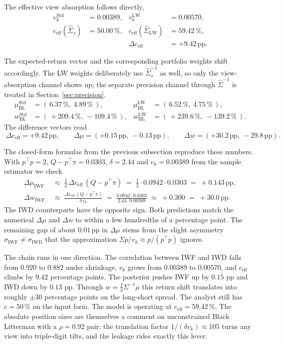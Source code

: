 \documentclass[a4paper,11pt]{article}
\theoremstyle{plain}
\theoremstyle{definition}
\newcommand{\Std}{\mathrm{Std}}
\newcommand{\LW}{\mathrm{LW}}
\newcommand{\eff}{\mathrm{eff}}
\begin{document}
The effective view absorption follows directly,
\begin{align*}
    v_k^\Std &= 0.00389, & v_k^\LW &= 0.00570,\\
    c_{\eff}(\hat{\Sigma}_s) &= 50.00\,\%, & c_{\eff}(\hat{\Sigma}_{\LW}) &= 59.42\,\%,\\
    & & \Delta c_{\eff} &= +9.42\,\text{pp}.
\end{align*}

The expected-return vector and the corresponding portfolio weights shift
accordingly. The LW weights deliberately use $\hat{\Sigma}_s^{-1}$ as
well, so only the view-absorption channel shows up; the separate
precision channel through $\hat{\Sigma}^{-1}$ is treated in
Section~\ref{sec:precision}.
\begin{align*}
    \mu_{\mathrm{BL}}^\Std &= (\,6.37\,\%,\ 4.89\,\%\,), & \mu_{\mathrm{BL}}^\LW &= (\,6.52\,\%,\ 4.75\,\%\,),\\
    w_{\mathrm{BL}}^\Std &= (\,+209.4\,\%,\ -109.4\,\%\,), & w_{\mathrm{BL}}^\LW &= (\,+239.6\,\%,\ -139.2\,\%\,).
\end{align*}
The difference vectors read
\[
    \boxed{\;
    \Delta c_{\eff} = +9.42\,\text{pp}, \qquad
    \Delta\mu = (+0.15\,\text{pp},\ -0.13\,\text{pp}), \qquad
    \Delta w = (+30.2\,\text{pp},\ -29.8\,\text{pp}).
    \;}
\]

The closed-form formulas from the previous subsection reproduce these
numbers. With $p^\top p = 2$, $Q - p^\top\pi = 0.0303$, $\delta = 2.44$
and $v_k = 0.00389$ from the sample estimator we check
\begin{align*}
    \Delta\mu_{\mathrm{IWF}} \;&\approx\; \tfrac{1}{2}\,\Delta c_{\eff}\,(Q-p^\top\pi)
    \;=\; \tfrac{1}{2}\cdot 0.0942 \cdot 0.0303
    \;=\; +0.143\,\text{pp},\\
    \Delta w_{\mathrm{IWF}} \;&\approx\; \frac{\Delta c_{\eff}\,(Q-p^\top\pi)}{\delta\,v_k}
    \;=\; \frac{0.0942 \cdot 0.0303}{2.44 \cdot 0.00389}
    \;\approx\; +0.300
    \;=\; +30.0\,\text{pp}.
\end{align*}
The IWD counterparts have the opposite sign. Both predictions match the
numerical $\Delta\mu$ and $\Delta w$ to within a few hundredths of a
percentage point. The remaining gap of about $0.01\,\text{pp}$ in
$\Delta\mu$ stems from the slight asymmetry
$\sigma_{\mathrm{IWF}} \neq \sigma_{\mathrm{IWD}}$ that the
approximation $\Sigma p / v_k \approx p / (p^\top p)$ ignores.

The chain runs in one direction. The correlation between IWF and IWD
falls from $0.920$ to $0.882$ under shrinkage, $v_k$ grows from
$0.00389$ to $0.00570$, and $c_{\eff}$ climbs by $9.42$ percentage
points. The posterior pushes IWF up by $0.15$ pp and IWD down by $0.13$
pp. Through $w = \tfrac{1}{\delta}\Sigma^{-1}\mu$ this return shift
translates into roughly $\pm 30$ percentage points on the long-short
spread. The analyst still has $c = 50\,\%$ on the input form. The model
is operating at $c_{\eff} = 59.42\,\%$. The absolute position sizes are
themselves a comment on unconstrained Black--Litterman with a
$\rho = 0.92$ pair: the translation factor $1/(\delta v_k) \approx 105$
turns any view into triple-digit tilts, and the leakage rides exactly
this lever.
\end{document}
